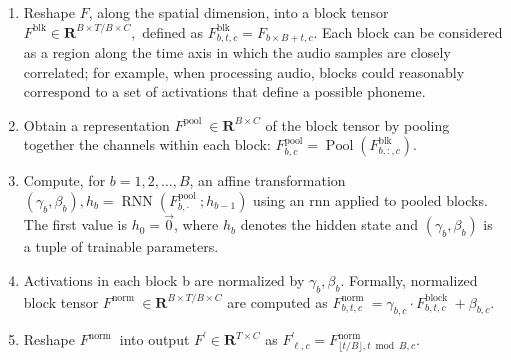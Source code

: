 \begin{enumerate}
	\item Reshape $F$, along the spatial dimension, into a block tensor $F^{\mathrm{blk}} \in \mathbf{R}^{B \times T / B \times C},$ defined as $F_{b, t, c}^{\mathrm{blk}}=F_{b \times B+t, c}$. Each block can be considered as a region along the time axis in which the audio samples are closely correlated; for example, when processing audio, blocks could reasonably correspond to a set of activations that define a possible phoneme. 
	\item Obtain a representation $F^{\text {pool }} \in \mathbf{R}^{B \times C}$ of the block tensor by pooling together the channels within each block: $F_{b, c}^{\mathrm{pool}}=\operatorname{Pool}\left(F_{b,:, c}^{\mathrm{blk}}\right)$.
	\item  Compute, for $b=1,2, \ldots, B$, an affine transformation $\left(\gamma_{b}, \beta_{b}\right), h_{b}=\operatorname{RNN}\left(F_{b, \cdot}^{\text {pool }} ; h_{b-1}\right)$ using an \gls{rnn} applied to pooled blocks. The first value is $h_{0}=\overrightarrow{0}$, where $h_b$ denotes the hidden state and $\left(\gamma_{b}, \beta_{b}\right)$ is a tuple of trainable parameters. 
	\item Activations in each block b are normalized by $\gamma_{b}, \beta_{b}$. Formally, normalized block tensor $F^{\text {norm }} \in \mathbf{R}^{B \times T / B \times C}$ are computed as $F_{b, t, c}^{\text {norm }}=\gamma_{b, c} \cdot F_{b, t, c}^{\text {block }}+\beta_{b, c}$.
	\item Reshape $F^{\text {norm }}$ into output $F^{\prime} \in \mathbf{R}^{T \times C}$ as $F_{\ell, c}^{\prime}=F_{\lfloor t / B\rfloor, t \bmod B, c}^{\text {norm }}$.
\end{enumerate}               
                      

